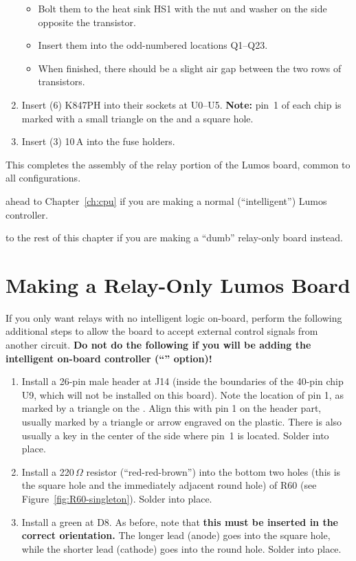 \documentclass[letterpaper,twoside,onecolumn,openright,final]{memoir}
\begin{document}
\begin{enumerate}
	\begin{itemize}
		\item	Bolt them to the heat sink HS1 with the nut and washer on the side opposite the
			transistor.
		\item	Insert them into the odd-numbered locations Q1--Q23.
		\item	When finished, there should be a slight air gap between the two rows of
			transistors.
	\end{itemize}
\item	Insert (6) K847PH  into their sockets at U0--U5.  {\bfseries Note:} pin~1
	of each chip is marked with a small triangle on the  and a square hole.
\item	Insert (3) 10\,A  into the fuse holders.
\end{enumerate}

This completes the assembly of the relay portion of the Lumos board, common to all configurations.

\bigskip

 ahead to Chapter~\ref{ch:cpu} if you are making a normal (``intelligent'') Lumos controller.

\bigskip

 to the rest of this chapter if you are making a ``dumb'' relay-only board instead.

\section{Making a Relay-Only Lumos Board}
If you only want relays with no intelligent logic on-board, perform the following additional
steps to allow the board to accept external control signals from another circuit.  {\bfseries Do not
do the following if you will be adding the intelligent on-board controller (``'' option)!}
\begin{enumerate}
\item	
	Install a 26-pin male header at J14 (inside the boundaries of the 40-pin chip U9, which will
	not be installed on this board).  Note the location of pin 1, as marked by a triangle on the
	.  Align this with pin 1 on the header part, usually marked by a triangle or arrow
	engraved on the plastic.  There is also usually a key in the center of the side where pin~1
	is located.  Solder into place.
\item	
	Install a 220\,$\Omega$ resistor (``red-red-brown'') 
	into the bottom two holes (this is the square hole and the
	immediately adjacent round hole) of R60 (see Figure~\ref{fig:R60-singleton}).  Solder into place.
\item	
	Install a green  at D8.  As before, note that {\bfseries this must be inserted
	in the correct orientation.} The longer lead (anode) goes into the square hole, while the shorter
	lead (cathode) goes into the round hole.  Solder into place.
\end{enumerate}
\end{document}
